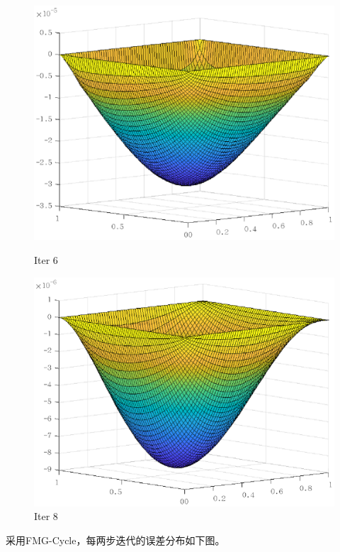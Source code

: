 \documentclass[lang=cn,10pt]{elegantbook}
\begin{document}
\begin{figure}[H]
  \begin{minipage}[t]{0.24\linewidth}
    \centering
    \includegraphics[width=0.8\linewidth]{figure/2-4-3.eps}
    \caption*{Iter 6}
  \end{minipage}
  \begin{minipage}[t]{0.24\linewidth}
    \centering
    \includegraphics[width=0.8\linewidth]{figure/2-4-4.eps}
    \caption*{Iter 8}
  \end{minipage}
\end{figure}

采用FMG-Cycle，每两步迭代的误差分布如下图。
\end{document}
